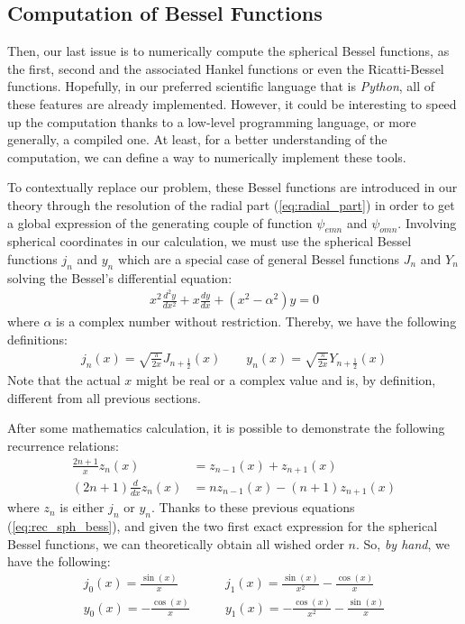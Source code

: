 \documentclass{article}
\numberwithin{equation}{section}
\begin{document}
\subsection{Computation of Bessel Functions}

Then, our last issue is to numerically compute the spherical Bessel functions, as the first, second and the associated Hankel functions or even the Ricatti-Bessel functions. Hopefully, in our preferred scientific language that is \textit{Python}, all of these features are already implemented. However, it could be interesting to speed up the computation thanks to a low-level programming language, or more generally, a compiled one. At least, for a better understanding of the computation, we can define a way to numerically implement these tools.

To contextually replace our problem, these Bessel functions are introduced in our theory through the resolution of the radial part (\ref{eq:radial_part}) in order to get a global expression of the generating couple of function $\psi_{emn}$ and $\psi_{omn}$. Involving spherical coordinates in our calculation, we must use the spherical Bessel functions $j_{n}$ and $y_{n}$ which are a special case of general Bessel functions $J_{n}$ and $Y_{n}$ solving the Bessel's differential equation:
\begin{align}
x^{2}\frac{d^{2}y}{dx^{2}} + x\frac{dy}{dx} + (x^{2} - \alpha^{2})y = 0
\end{align}
where $\alpha$ is a complex number without restriction. Thereby, we have the following definitions:
\begin{align}
j_{n}(x)=\sqrt{\frac{\pi}{2x}}J_{n+\frac{1}{2}}(x) \qquad y_{n}(x)=\sqrt{\frac{\pi}{2x}}Y_{n+\frac{1}{2}}(x)
\end{align}
Note that the actual $x$ might be real or a complex value and is, by definition, different from all previous sections.

After some mathematics calculation, it is possible to demonstrate the following recurrence relations:
\begin{align}\label{eq:rec_sph_bess}
\frac{2n+1}{x}z_{n}(x) &= z_{n-1}(x) + z_{n+1}(x)\\
(2n+1)\frac{d}{dx}z_{n}(x) &= nz_{n-1}(x) - (n+1)z_{n+1}(x)
\end{align}
where $z_{n}$ is either $j_{n}$ or $y_{n}$. Thanks to these previous equations (\ref{eq:rec_sph_bess}), and given the two first exact expression for the spherical Bessel functions, we can theoretically obtain all wished order $n$. So, \textit{by hand}, we have the following:
\begin{equation}
\begin{aligned}
j_{0}(x)=\frac{\sin(x)}{x} \qquad &j_{1}(x)=\frac{\sin(x)}{x^{2}} - \frac{\cos(x)}{x}\\
y_{0}(x)=-\frac{\cos(x)}{x} \qquad &y_{1}(x)=-\frac{\cos(x)}{x^{2}}-\frac{\sin(x)}{x}
\end{aligned}
\end{equation}
\end{document}
